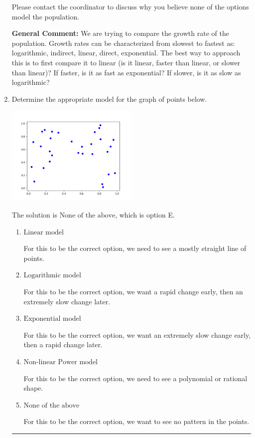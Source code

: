 \documentclass{extbook}[14pt]
\newcommand{\litem}[1]{\item #1

\rule{\textwidth}{0.4pt}}
\begin{document}
\begin{enumerate}
{\begin{enumerate}[label=\Alph*.]
Please contact the coordinator to discuss why you believe none of the options model the population.
\end{enumerate}

\textbf{General Comment:} We are trying to compare the growth rate of the population. Growth rates can be characterized from slowest to fastest as: logarithmic, indirect, linear, direct, exponential. The best way to approach this is to first compare it to linear (is it linear, faster than linear, or slower than linear)? If faster, is it as fast as exponential? If slower, is it as slow as logarithmic?
}
\litem{
Determine the appropriate model for the graph of points below.

\begin{center}
    \includegraphics[width=0.5\textwidth]{../Figures/identifyModelGraph11CopyB.png}
\end{center}


The solution is \( \text{None of the above} \), which is option E.\begin{enumerate}[label=\Alph*.]
\item \( \text{Linear model} \)

For this to be the correct option, we need to see a mostly straight line of points.
\item \( \text{Logarithmic model} \)

For this to be the correct option, we want a rapid change early, then an extremely slow change later.
\item \( \text{Exponential model} \)

For this to be the correct option, we want an extremely slow change early, then a rapid change later.
\item \( \text{Non-linear Power model} \)

For this to be the correct option, we need to see a polynomial or rational shape.
\item \( \text{None of the above} \)

For this to be the correct option, we want to see no pattern in the points.
\end{enumerate}

}
\end{enumerate}
\end{document}
